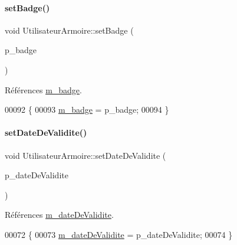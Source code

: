 \mbox{\label{class_utilisateur_armoire_afee7add8e43ae142c815f0d14491b01e}} 
\paragraph{\texorpdfstring{set\+Badge()}{setBadge()}}
{\footnotesize\ttfamily void Utilisateur\+Armoire\+::set\+Badge (\begin{DoxyParamCaption}\item[{Q\+String}]{p\+\_\+badge }\end{DoxyParamCaption})}



Références \hyperlink{class_utilisateur_armoire_a1a3170a83da04d9f49816a98b226baeb}{m\+\_\+badge}.


\begin{DoxyCode}
00092 \{
00093     \hyperlink{class_utilisateur_armoire_a1a3170a83da04d9f49816a98b226baeb}{m\_badge} = p\_badge;
00094 \}
\end{DoxyCode}
\mbox{\label{class_utilisateur_armoire_abe51b503b17f3d90c7ebe0546ed39cc0}} 
\paragraph{\texorpdfstring{set\+Date\+De\+Validite()}{setDateDeValidite()}}
{\footnotesize\ttfamily void Utilisateur\+Armoire\+::set\+Date\+De\+Validite (\begin{DoxyParamCaption}\item[{Q\+String}]{p\+\_\+date\+De\+Validite }\end{DoxyParamCaption})}



Références \hyperlink{class_utilisateur_armoire_a51bd81c78d69ea2699373d820bae31e4}{m\+\_\+date\+De\+Validite}.


\begin{DoxyCode}
00072 \{
00073     \hyperlink{class_utilisateur_armoire_a51bd81c78d69ea2699373d820bae31e4}{m\_dateDeValidite} = p\_dateDeValidite;
00074 \}
\end{DoxyCode}
\mbox{\label{class_utilisateur_armoire_ad1ebf69b10f99b062631a92a3f0ebd2b}} 
